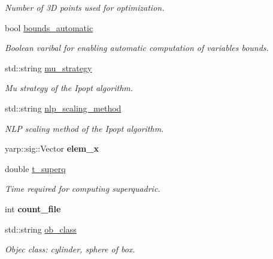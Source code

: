 \begin{DoxyCompactItemize}
\begin{DoxyCompactList}\small\item\em Number of 3D points used for optimization. \end{DoxyCompactList}\item 
\mbox{\label{classSuperqComputation_a88a2dd407f7f5d2f6188b9b117102c00}} 
bool \mbox{\hyperlink{classSuperqComputation_a88a2dd407f7f5d2f6188b9b117102c00}{bounds\+\_\+automatic}}
\begin{DoxyCompactList}\small\item\em Boolean varibal for enabling automatic computation of variables bounds. \end{DoxyCompactList}\item 
\mbox{\label{classSuperqComputation_ac526d6a64e9015e9b7eb454a87882011}} 
std\+::string \mbox{\hyperlink{classSuperqComputation_ac526d6a64e9015e9b7eb454a87882011}{mu\+\_\+strategy}}
\begin{DoxyCompactList}\small\item\em Mu strategy of the Ipopt algorithm. \end{DoxyCompactList}\item 
\mbox{\label{classSuperqComputation_add6516c9ef0aeb658ea9f8fab49f14bc}} 
std\+::string \mbox{\hyperlink{classSuperqComputation_add6516c9ef0aeb658ea9f8fab49f14bc}{nlp\+\_\+scaling\+\_\+method}}
\begin{DoxyCompactList}\small\item\em N\+LP scaling method of the Ipopt algorithm. \end{DoxyCompactList}\item 
\mbox{\label{classSuperqComputation_ad940fa340f762266eb59ade68aa4b2ae}} 
yarp\+::sig\+::\+Vector {\bfseries elem\+\_\+x}
\item 
\mbox{\label{classSuperqComputation_a8414fb4c30070a8510bd9bc46f70514f}} 
double \mbox{\hyperlink{classSuperqComputation_a8414fb4c30070a8510bd9bc46f70514f}{t\+\_\+superq}}
\begin{DoxyCompactList}\small\item\em Time required for computing superquadric. \end{DoxyCompactList}\item 
\mbox{\label{classSuperqComputation_a490818d0b38fb4d12778e7b36b93d2c1}} 
int {\bfseries count\+\_\+file}
\item 
\mbox{\label{classSuperqComputation_a8e122bb9464e111f68fc5c8a4e9fc32e}} 
std\+::string \mbox{\hyperlink{classSuperqComputation_a8e122bb9464e111f68fc5c8a4e9fc32e}{ob\+\_\+class}}
\begin{DoxyCompactList}\small\item\em Objec class\+: cylinder, sphere of box. \end{DoxyCompactList}\item 

\end{DoxyCompactItemize}
